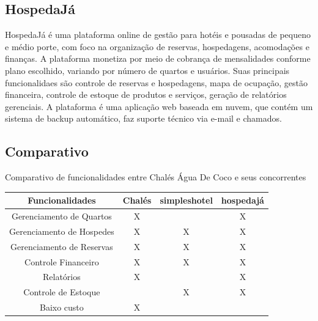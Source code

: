 \documentclass[
	12pt,				%
	openany,			%
	twoside,			%
	a4paper,			%
	english,			%
	french,				%
	spanish,			%
	brazil				%
	]{abntex2}
\begin{document}
\subsection{HospedaJá}
HospedaJá é uma plataforma online de gestão para hotéis e pousadas de pequeno e médio porte, com foco na organização de reservas, hospedagens, acomodações e finanças.
A plataforma monetiza por meio de cobrança de mensalidades conforme plano escolhido, variando por número de quartos e usuários.
Suas principais funcionalidaes são controle de reservas e hospedagens, mapa de ocupação, gestão financeira, controle de estoque de produtos e serviços, geração de relatórios gerenciais.
A plataforma é uma aplicação web baseada em nuvem, que contém um sistema de backup automático, faz suporte técnico via e-mail e chamados.
\subsection{Comparativo}
\begin{quadro}[htb]
	\caption{\label{quadro_exemplo}Comparativo de funcionalidades entre Chalés Água De Coco e seus concorrentes}
	\begin{tabular}{|c|c|c|c|}
		\hline
		\textbf{Funcionalidades} & \textbf{Chalés} & \textbf{simpleshotel} & \textbf{hospedajá} \\ \hline
		Gerenciamento de Quartos & X    &    & X    \\ \hline
		Gerenciamento de Hospedes  & X    & X   & X    \\ \hline
		Gerenciamento de Reservas    & X   & X  & X    \\ \hline
		Controle Financeiro  & X    & X   & X    \\ \hline
		Relatórios  & X    &    & X    \\ \hline
		Controle de Estoque  &     & X   & X    \\ \hline
		Baixo custo & X    &    &     \\ \hline
	\end{tabular}
\end{quadro} 

%
\end{document}
